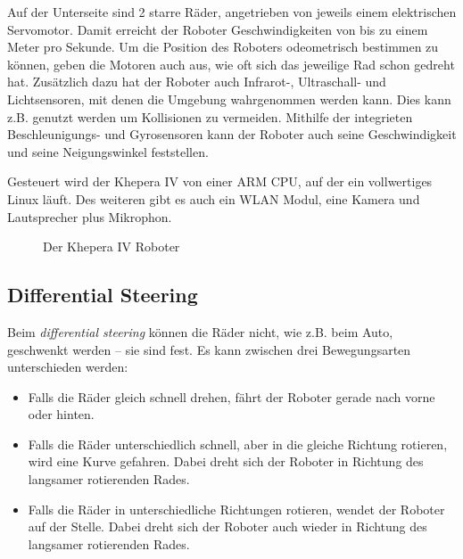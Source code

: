 Auf der Unterseite sind 2 starre R{\"{a}}der, angetrieben von jeweils einem elektrischen Servomotor. Damit erreicht der Roboter Geschwindigkeiten von bis zu einem Meter pro Sekunde.
Um die Position des Roboters odeometrisch bestimmen zu k{\"{o}}nnen, geben die Motoren auch aus, wie oft sich das jeweilige Rad schon gedreht hat. Zus{\"{a}}tzlich dazu hat der Roboter
auch Infrarot-, Ultraschall- und Lichtsensoren, mit denen die Umgebung wahrgenommen werden kann. Dies kann z.B. genutzt werden um Kollisionen zu vermeiden.
Mithilfe der integrieten Beschleunigungs- und Gyrosensoren kann der Roboter auch seine Geschwindigkeit und seine Neigungswinkel feststellen.

Gesteuert wird der Khepera IV von einer ARM CPU, auf der ein vollwertiges Linux l{\"{a}}uft. Des weiteren gibt es auch ein WLAN Modul, eine Kamera und Lautsprecher plus Mikrophon.

\begin{figure}
	\centering
	\caption{Der Khepera IV Roboter}
	\label{fig:kheperaiv}
\end{figure}
\clearpage

\subsection{Differential Steering}\label{diffs}
Beim \textit{differential steering} k{\"{o}}nnen die R{\"{a}}der nicht, wie z.B. beim Auto, geschwenkt werden -- sie sind fest. Es kann zwischen drei Bewegungsarten unterschieden werden:
\begin{itemize}
\item Falls die R{\"{a}}der gleich schnell drehen, f{\"{a}}hrt der Roboter gerade nach vorne oder hinten.
\item Falls die R{\"{a}}der unterschiedlich schnell, aber in die gleiche Richtung rotieren, wird eine Kurve gefahren. Dabei dreht sich der Roboter in Richtung des langsamer rotierenden Rades.
\item Falls die R{\"{a}}der in unterschiedliche Richtungen rotieren, wendet der Roboter auf der Stelle. Dabei dreht sich der Roboter auch wieder in Richtung des langsamer rotierenden Rades.
\end{itemize}

